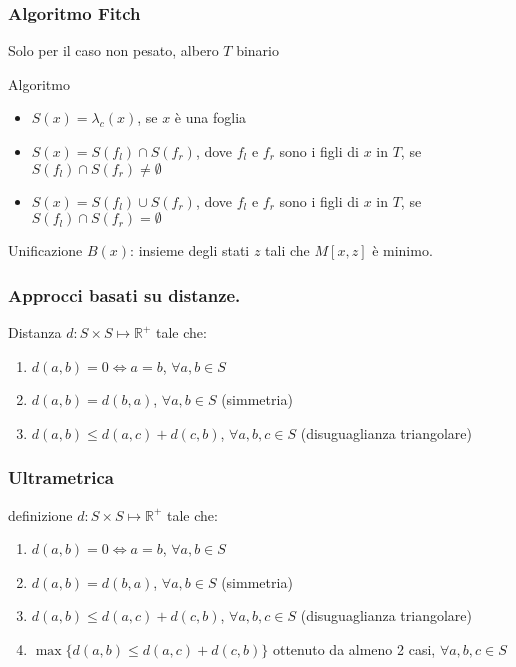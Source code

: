 \begin{frame}[fragile]
\frametitle{Algoritmo Fitch}
Solo per il caso non pesato, albero $T$ binario
\begin{block}{Algoritmo}
\begin{itemize}
\item
$S(x)=\lambda_{c}(x)$, se $x$ è una foglia
\item
$S(x)= S(f_{l}) \cap S(f_{r})$, dove $f_{l}$ e $f_{r}$ sono i figli di $x$ in $T$,
se $S(f_{l}) \cap S(f_{r})\neq \emptyset$
\item
$S(x)= S(f_{l}) \cup S(f_{r})$, dove $f_{l}$ e $f_{r}$ sono i figli di $x$ in $T$,
se $S(f_{l}) \cap S(f_{r}) = \emptyset$
\end{itemize}
\end{block}
\begin{block}{Unificazione}
$B(x)$: insieme degli stati $z$ tali che $M[x,z]$ è minimo.
\end{block}
\end{frame}

\begin{frame}[fragile]
\frametitle{Approcci basati su distanze.}
\begin{block}{Distanza}
$d: S \times S \mapsto \mathbb{R}^{+}$ tale che:
\begin{enumerate}
\item
$d(a,b) = 0 \Leftrightarrow a=b$, $\forall a,b\in S$
\item
$d(a,b) = d(b,a)$, $\forall a,b\in S$ (simmetria)
\item
$d(a,b) \le d(a,c) + d(c,b)$, $\forall a,b,c\in S$ (disuguaglianza triangolare)
\end{enumerate}
\end{block}
\end{frame}

\begin{frame}[fragile]
\frametitle{Ultrametrica}
\begin{block}{definizione}
$d: S \times S \mapsto \mathbb{R}^{+}$ tale che:
\begin{enumerate}
\item
$d(a,b) = 0 \Leftrightarrow a=b$, $\forall a,b\in S$
\item
$d(a,b) = d(b,a)$, $\forall a,b\in S$ (simmetria)
\item
$d(a,b) \le d(a,c) + d(c,b)$, $\forall a,b,c\in S$ (disuguaglianza triangolare)
\item
$\max\{d(a,b) \le d(a,c) + d(c,b) \}$ ottenuto da almeno 2 casi, $\forall a,b,c\in S$
\end{enumerate}
\end{block}
\end{frame}



